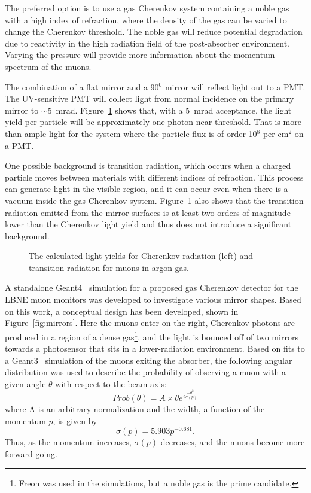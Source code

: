 The preferred option is to use a gas Cherenkov system containing a
noble gas with a high index of refraction, where the density of the
gas can be varied to change the Cherenkov threshold. The noble gas
will reduce potential degradation due to reactivity in the high
radiation field of the post-absorber environment. Varying the pressure
will provide more information about the momentum spectrum of the
muons.

The combination of a flat mirror and a 90$^0$ mirror will reflect
light out to a PMT. The UV-sensitive PMT will collect light from
normal incidence on the primary mirror to $\sim$5~mrad. Figure~\ref{fig:LightYield} 
shows that, with a 5~mrad acceptance, the light
yield per particle will be approximately one photon near
threshold. That is more than ample light for the system where the
particle flux is of order 10$^8$ per cm$^2$ on a PMT. 

One possible background is transition radiation, which occurs when a charged particle moves between materials with different indices of refraction.  This process can generate light in the visible region, and it can occur even when there is a vacuum inside the gas Cherenkov system.
Figure~\ref{fig:LightYield} also shows that the transition radiation
emitted from the mirror surfaces is at least two orders of
magnitude lower than the Cherenkov light yield and thus does not introduce a
significant background.

\begin{figure}[htbp]
\centering
\caption[Cherenkov and Transition Radiation Yields]{ The calculated light yields for Cherenkov radiation (left) and transition radiation for muons in argon gas.}
\label{fig:LightYield}
\end{figure}

A standalone Geant4~\cite{GEANT4:NIM}  
simulation for a proposed gas Cherenkov detector
for the LBNE muon monitors was developed to investigate various mirror
shapes.  Based on this work, a conceptual design has been developed,
 shown in Figure~\ref{fig:mirrors}.  Here the muons enter on the
right, Cherenkov photons are produced in a region of a dense
gas\footnote{Freon was used in the simulations, but a noble gas is the
prime candidate.}, and the light is bounced off of two mirrors towards a
photosensor that sits in a lower-radiation environment. Based on fits
to a Geant3~\cite{Geant3}  simulation of the muons exiting the absorber, the
following angular distribution was used to describe the probability of
observing a muon with a given angle $\theta$ with respect to the beam axis:
\begin{equation}
Prob(\theta)=A \times \theta e^{\frac{-\theta^2}{2\sigma (p)}}
\end{equation}
where A is an arbitrary normalization and the width, a function of
the momentum $p$, is given by
\begin{equation}
\sigma (p) = 5.903 p^{-0.681}.
\end{equation}
Thus, as the momentum increases, $\sigma (p)$ decreases, and the muons
become more forward-going.

